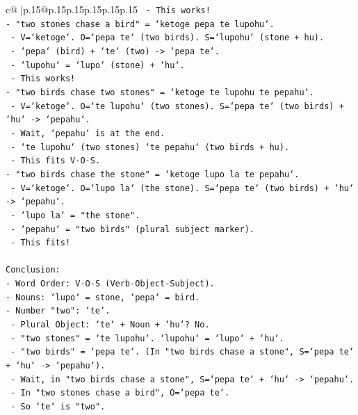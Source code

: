 \documentclass{article}
\begin{document}
{\begin{supertabular}{c@{$\;$}|p{.15\linewidth}@{}p{.15\linewidth}p{.15\linewidth}p{.15\linewidth}p{.15\linewidth}p{.15\linewidth}}
{{{\texttt{  {-} This works!} \\
\texttt{{-} "two stones chase a bird" = `ketoge pepa te lupohu`.} \\
\texttt{  {-} V=`ketoge`. O=`pepa te` (two birds). S=`lupohu` (stone + hu).} \\
\texttt{  {-} `pepa` (bird) + `te` (two) {-}> `pepa te`.} \\
\texttt{  {-} `lupohu` = `lupo` (stone) + `hu`.} \\
\texttt{  {-} This works!} \\
\texttt{{-} "two birds chase two stones" = `ketoge te lupohu te pepahu`.} \\
\texttt{  {-} V=`ketoge`. O=`te lupohu` (two stones). S=`pepa te` (two birds) + `hu` {-}> `pepahu`.} \\
\texttt{  {-} Wait, `pepahu` is at the end.} \\
\texttt{  {-} `te lupohu` (two stones) `te pepahu` (two birds + hu).} \\
\texttt{  {-} This fits V{-}O{-}S.} \\
\texttt{{-} "two birds chase the stone" = `ketoge lupo la te pepahu`.} \\
\texttt{  {-} V=`ketoge`. O=`lupo la` (the stone). S=`pepa te` (two birds) + `hu` {-}> `pepahu`.} \\
\texttt{  {-} `lupo la` = "the stone".} \\
\texttt{  {-} `pepahu` = "two birds" (plural subject marker).} \\
\texttt{  {-} This fits!} \\
\\ 
\texttt{Conclusion:} \\
\texttt{{-} Word Order: V{-}O{-}S (Verb{-}Object{-}Subject).} \\
\texttt{{-} Nouns: `lupo` = stone, `pepa` = bird.} \\
\texttt{{-} Number "two": `te`.} \\
\texttt{  {-} Plural Object: `te` + Noun + `hu`? No.} \\
\texttt{  {-} "two stones" = `te lupohu`. `lupohu` = `lupo` + `hu`.} \\
\texttt{  {-} "two birds" = `pepa te`. (In "two birds chase a stone", S=`pepa te` + `hu` {-}> `pepahu`).} \\
\texttt{  {-} Wait, in "two birds chase a stone", S=`pepa te` + `hu` {-}> `pepahu`.} \\
\texttt{  {-} In "two stones chase a bird", O=`pepa te`.} \\
\texttt{  {-} So `te` is "two".} \\
}}}
\end{supertabular}}
\end{document}
